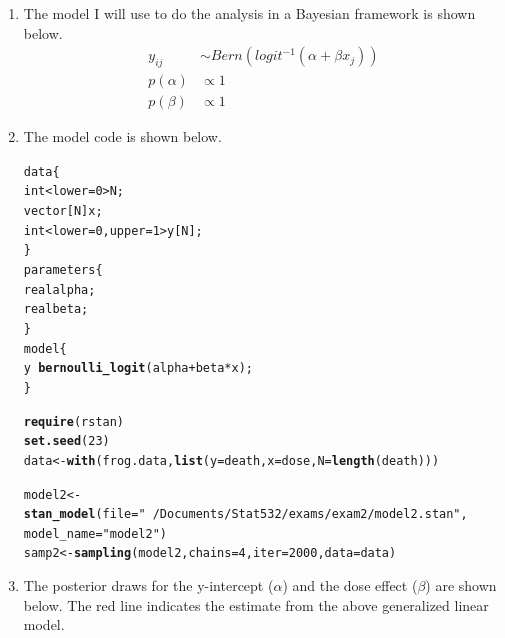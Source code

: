\documentclass[12pt]{article}\usepackage[]{graphicx}\usepackage[]{color}
\makeatletter
\newcommand{\hlnum}[1]{\textcolor[rgb]{0.686,0.059,0.569}{#1}}%
\newcommand{\hlstr}[1]{\textcolor[rgb]{0.192,0.494,0.8}{#1}}%
\newcommand{\hlstd}[1]{\textcolor[rgb]{0.345,0.345,0.345}{#1}}%
\newcommand{\hlkwb}[1]{\textcolor[rgb]{0.69,0.353,0.396}{#1}}%
\newcommand{\hlkwc}[1]{\textcolor[rgb]{0.333,0.667,0.333}{#1}}%
\newcommand{\hlkwd}[1]{\textcolor[rgb]{0.737,0.353,0.396}{\textbf{#1}}}%
\newenvironment{kframe}{%
 \def\at@end@of@kframe{}%
 \ifinner\ifhmode%
  \def\at@end@of@kframe{\end{minipage}}%
  \begin{minipage}{\columnwidth}%
 \fi\fi%
 \def\FrameCommand##1{\hskip\@totalleftmargin \hskip-\fboxsep
 \colorbox{shadecolor}{##1}\hskip-\fboxsep
     \hskip-\linewidth \hskip-\@totalleftmargin \hskip\columnwidth}%
 \MakeFramed {\advance\hsize-\width
   \@totalleftmargin\z@ \linewidth\hsize
   \@setminipage}}%
 {\par\unskip\endMakeFramed%
 \at@end@of@kframe}
\newenvironment{knitrout}{}{} %
\makeatother
\begin{document}
\begin{enumerate}
\begin{enumerate}
\begin{knitrout}
\end{knitrout}

\item The model I will use to do the analysis in a Bayesian framework is shown below. 
\begin{align*}
y_{ij} &\sim Bern(logit^{-1}(\alpha + \beta x_j)) \\
p(\alpha) &\propto 1 \\
p(\beta) &\propto 1
\end{align*}

\item The model code is shown below.
\begin{knitrout}\footnotesize
{}\color{fgcolor}\begin{kframe}
\begin{alltt}
data \{
  int<lower=0> N;
  vector[N] x;
  int<lower=0,upper=1> y[N];
\}
parameters \{
  real alpha;
  real beta;
\}
model \{
  y ~ \hlkwd{bernoulli_logit}(alpha + beta * x);
\}
\end{alltt}
\end{kframe}
\end{knitrout}


\begin{knitrout}\footnotesize
{}\color{fgcolor}\begin{kframe}
\begin{alltt}
\hlkwd{require}\hlstd{(rstan)}
\hlkwd{set.seed}\hlstd{(}\hlnum{23}\hlstd{)}
\hlstd{data} \hlkwb{<-} \hlkwd{with}\hlstd{(frog.data,} \hlkwd{list}\hlstd{(}\hlkwc{y} \hlstd{= death,} \hlkwc{x} \hlstd{= dose,} \hlkwc{N} \hlstd{=} \hlkwd{length}\hlstd{(death)))}

\hlstd{model2} \hlkwb{<-} \hlkwd{stan_model}\hlstd{(}\hlkwc{file} \hlstd{=} \hlstr{"~/Documents/Stat532/exams/exam2/model2.stan"}\hlstd{,}
                     \hlkwc{model_name} \hlstd{=} \hlstr{"model2"}\hlstd{)}
\hlstd{samp2} \hlkwb{<-} \hlkwd{sampling}\hlstd{(model2,} \hlkwc{chains} \hlstd{=} \hlnum{4}\hlstd{,} \hlkwc{iter} \hlstd{=} \hlnum{2000}\hlstd{,} \hlkwc{data} \hlstd{= data)}
\end{alltt}
\end{kframe}
\end{knitrout}

\item The posterior draws for the y-intercept ($\alpha$) and the dose effect ($\beta$) are shown below. The red line indicates the estimate from the above generalized linear model.


\end{enumerate}
\end{enumerate}
\end{document}
